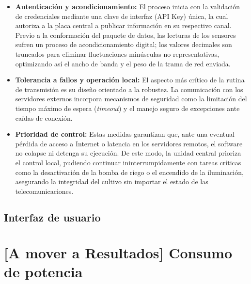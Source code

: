 \begin{itemize}
    \item \textbf{Autenticación y acondicionamiento:} El proceso inicia con la validación de credenciales mediante una clave de interfaz (API Key) única, la cual autoriza a la placa central a publicar información en su respectivo canal. Previo a la conformación del paquete de datos, las lecturas de los sensores sufren un proceso de acondicionamiento digital; los valores decimales son truncados para eliminar fluctuaciones minúsculas no representativas, optimizando así el ancho de banda y el peso de la trama de red enviada.
    \item \textbf{Tolerancia a fallos y operación local:} El aspecto más crítico de la rutina de transmisión es su diseño orientado a la robustez. La comunicación con los servidores externos incorpora mecanismos de seguridad como la limitación del tiempo máximo de espera (\textit{timeout}) y el manejo seguro de excepciones ante caídas de conexión.
    \item \textbf{Prioridad de control:} Estas medidas garantizan que, ante una eventual pérdida de acceso a Internet o latencia en los servidores remotos, el software no colapse ni detenga su ejecución. De este modo, la unidad central prioriza el control local, pudiendo continuar ininterrumpidamente con tareas críticas como la desactivación de la bomba de riego o el encendido de la iluminación, asegurando la integridad del cultivo sin importar el estado de las telecomunicaciones.
\end{itemize}


\section{Interfaz de usuario}
\label{sec:interfaz_usuario}


\chapter*{[A mover a Resultados] Consumo de potencia}
\label{cha:consumo_potencia}

